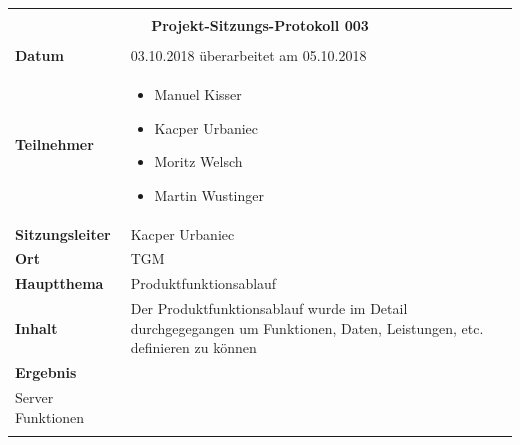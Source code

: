 \begin{center}
\begin{footnotesize}
\begingroup
\renewcommand*{\arraystretch}{1.45} %
\begin{tabularx}{\textwidth}{|p{2cm}|X|}
    \hline
    \multicolumn{2}{|c|}{\vspace{-0.1cm}\rowcolor{gray}} \\
    \multicolumn{2}{|c|}{\rowcolor{gray}\bfseries \normalsize \color{white} Projekt-Sitzungs-Protokoll 003 \vspace{-0.01cm}} \\
    \multicolumn{2}{|c|}{\rowcolor{gray}} \\
    \hline
    \textbf{Datum} & 03.10.2018 überarbeitet am 05.10.2018 \\
    \hline
    \textbf{Teilnehmer} & 
    \begin{minipage}{.6\textwidth} 
     \begin{flushleft}
        \begin{itemize} \vspace{0.1cm}
        \item Manuel Kisser
        \item Kacper Urbaniec
        \item Moritz Welsch
        \item Martin Wustinger
         \vspace{0.2cm}
     \end{itemize}
     \end{flushleft}
     \end{minipage} \\
     \hline
     \textbf{Sitzungsleiter} & Kacper Urbaniec \\
     \hline
     \textbf{Ort} & TGM \\
     \hline
     \textbf{Hauptthema} & Produktfunktionsablauf  \\
     \hline
     \textbf{Inhalt} & Der Produktfunktionsablauf wurde im Detail durchgegegangen um Funktionen, Daten, Leistungen, etc. definieren zu können \\
     \hline
     \textbf{Ergebnis} & 
     \begin{minipage}{.81\textwidth} 
     \begin{flushleft}
        \vspace{0.1cm}
        \textbf{Produktfunktionen} \\
        Server Funktionen \\
        \begin{itemize}

\end{itemize}
\end{flushleft}
\end{minipage}
\end{tabularx}
\end{footnotesize}
\end{center}
